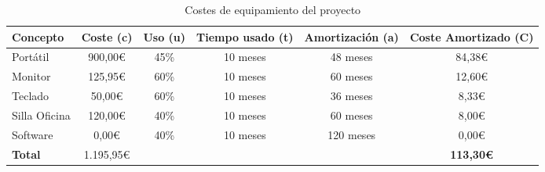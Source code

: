 \begin{table}[htbp]
    \begin{adjustbox}{max width=\textwidth}
    \centering
    \caption{Costes de equipamiento del proyecto}
    \label{tab:costes_equipamiento}
    \begin{tabular}{@{}lccccc@{}}
    \toprule
    \textbf{Concepto} & \multicolumn{1}{l}{\textbf{Coste (c)}} & \multicolumn{1}{l}{\textbf{Uso (u)}} & \multicolumn{1}{l}{\textbf{Tiempo usado (t)}} & \multicolumn{1}{l}{\textbf{Amortización (a)}} & \multicolumn{1}{l}{\textbf{Coste Amortizado (C)}} \\ \midrule
    Portátil          & 900,00\euro                                & 45\%                                 & 10 meses                                      & 48 meses                                      & 84,38\euro                                            \\
    Monitor           & 125,95\euro                                & 60\%                                 & 10 meses                                      & 60 meses                                      & 12,60\euro                                            \\
    Teclado           & 50,00\euro                                 & 60\%                                 & 10 meses                                      & 36 meses                                      & 8,33\euro                                             \\
    Silla Oficina     & 120,00\euro                                & 40\%                                 & 10 meses                                      & 60 meses                                      & 8,00\euro                                             \\
    Software          & 0,00\euro                                  & 40\%                                 & 10 meses                                      & 120 meses                                     & 0,00\euro                                             \\ \midrule
    \textbf{Total}    & 1.195,95\euro                              &                                      &                                               &                                               & \textbf{113,30\euro}                                  \\ \bottomrule
    \end{tabular}
    \end{adjustbox}
\end{table}


